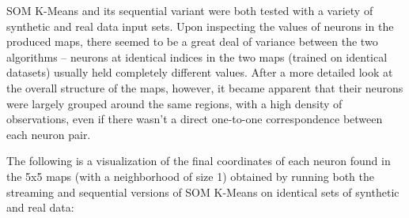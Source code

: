 \documentclass{l4proj}
\begin{document}
SOM K-Means and its sequential variant were both tested with a variety of synthetic and real data input sets. Upon inspecting the values of neurons in the produced maps, there seemed to be a great deal of variance between the two algorithms -- neurons at identical indices in the two maps (trained on identical datasets) usually held completely different values. After a more detailed look at the overall structure of the maps, however, it became apparent that their neurons were largely grouped around the same regions, with a high density of observations, even if there wasn't a direct one-to-one correspondence between each neuron pair. 

The following is a visualization of the final coordinates of each neuron found in the 5x5 maps (with a neighborhood of size 1) obtained by running both the streaming and sequential versions of SOM K-Means on identical sets of synthetic and real data:
\end{document}
